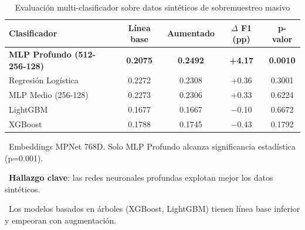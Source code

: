 \begin{table}[htbp]
\centering
\caption{Evaluación multi-clasificador sobre datos sintéticos de sobremuestreo masivo}
\label{tab:multiclassifier}
\begin{tabular}{lcccc}
\toprule
\textbf{Clasificador} & \textbf{Línea base} & \textbf{Aumentado} & \textbf{$\Delta$ F1 (pp)} & \textbf{p-valor} \\
\midrule
\rowcolor{green!20}
\textbf{MLP Profundo (512-256-128)} & \textbf{0.2075} & \textbf{0.2492} & \textbf{+4.17} & \textbf{0.0010} \\
Regresión Logística & 0.2272 & 0.2308 & +0.36 & 0.3001 \\
MLP Medio (256-128) & 0.2273 & 0.2306 & +0.33 & 0.6224 \\
LightGBM & 0.1677 & 0.1667 & $-$0.10 & 0.6672 \\
XGBoost & 0.1788 & 0.1745 & $-$0.43 & 0.1792 \\
\bottomrule
\end{tabular}
\vspace{0.5em}\footnotesize

\textbullet\ Embeddings MPNet 768D. Solo MLP Profundo alcanza significancia estadística (p=0.001).

\textbullet\ \textbf{Hallazgo clave}: las redes neuronales profundas explotan mejor los datos sintéticos.

\textbullet\ Los modelos basados en árboles (XGBoost, LightGBM) tienen línea base inferior y empeoran con augmentación.

\end{table}
